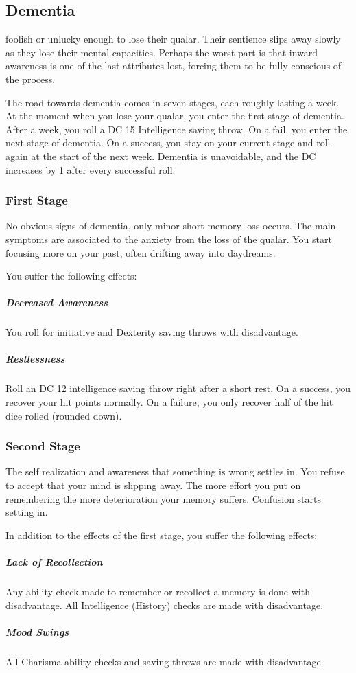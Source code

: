 

\subsection*{Dementia} \label{ssec::dementia}
foolish or unlucky enough to lose their qualar.
Their sentience slips away slowly as they lose their mental capacities.
Perhaps the worst part is that inward awareness is one of the last attributes lost, forcing them to be fully conscious of the process.

The road towards dementia comes in seven stages, each roughly lasting a week.
At the moment when you lose your qualar, you enter the first stage of dementia.
After a week, you roll a DC 15 Intelligence saving throw.
On a fail, you enter the next stage of dementia.
On a success, you stay on your current stage and roll again at the start of the next week.
Dementia is unavoidable, and the DC increases by 1 after every successful roll.

\subsubsection{First Stage}
    No obvious signs of dementia, only minor short-memory loss occurs.
    The main symptoms are associated to the anxiety from the loss of the qualar.
    You start focusing more on your past, often drifting away into daydreams.

    You suffer the following effects:
    \subparagraph{Decreased Awareness} You roll for initiative and Dexterity saving throws with disadvantage.
    \subparagraph{Restlessness} Roll an DC 12 intelligence saving throw right after a short rest.
    On a success, you recover your hit points normally.
    On a failure, you only recover half of the hit dice rolled (rounded down).

\subsubsection{Second Stage}
    The self realization and awareness that something is wrong settles in.
    You refuse to accept that your mind is slipping away.
    The more effort you put on remembering the more deterioration your memory suffers.
    Confusion starts setting in.

    In addition to the effects of the first stage, you suffer the following effects:
    \subparagraph{Lack of Recollection} Any ability check made to remember or recollect a memory is done with disadvantage.
    All Intelligence (History) checks are made with disadvantage.
    \subparagraph{Mood Swings} All Charisma ability checks and saving throws are made with disadvantage.

